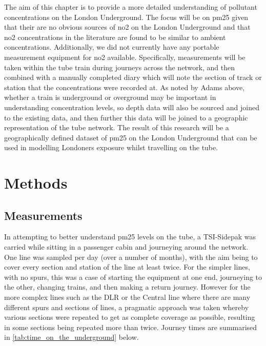 The aim of this chapter is to provide a more detailed understanding of pollutant concentrations on the London Underground. The focus will be on \gls{pm25} given that their are no obvious sources of \gls{no2} on the London Underground and that \gls{no2} concentrations in the literature are found to be similar to ambient concentrations. Additionally, we did not currently have any portable measurement equipment for \gls{no2} available. Specifically, measurements will be taken within the tube train during journeys across the network, and then combined with a manually completed diary which will note the section of track or station that the concentrations were recorded at. As noted by Adams above, whether a train is underground or overground may be important in understanding concentration levels, so depth data will also be sourced and joined to the existing data, and then further this data will be joined to a geographic representation of the tube network. The result of this research will be a geographically defined dataset of \gls{pm25} on the London Underground that can be used in modelling Londoners exposure whilst travelling on the tube.

\section{Methods}
\label{sec:3methods}

\subsection{Measurements}
\label{measurements}

In attempting to better understand \gls{pm25} levels on the tube, a TSI-Sidepak was carried while sitting in a passenger cabin and journeying around the network. One line was sampled per day (over a number of months), with the aim being to cover every section and station of the line at least twice. For the simpler lines, with no spurs, this was a case of starting the equipment at one end, journeying to the other, changing trains, and then making a return journey. However for the more complex lines such as the DLR or the Central line where there are many different spurs and sections of lines, a pragmatic approach was taken whereby various sections were repeated to get as complete coverage as possible, resulting in some sections being repeated more than twice. Journey times are summarised in \autoref{tab:time_on_the_underground} below.

